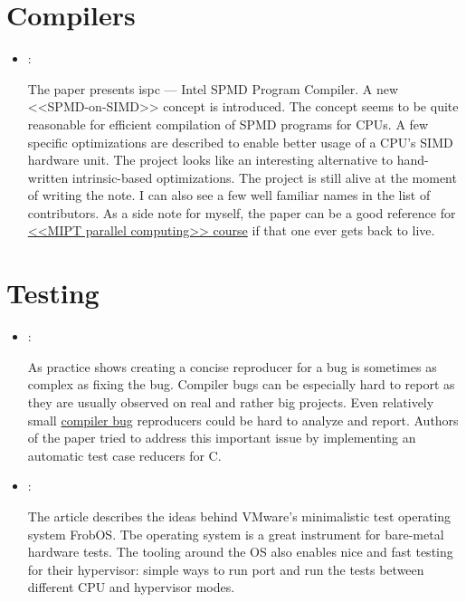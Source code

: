 \section*{Compilers}
\begin{itemize}
    \item \cite{Pharr:ispc:2012}:

    The paper presents ispc --- Intel SPMD Program Compiler. A new <<SPMD-on-SIMD>> concept is introduced. The concept seems to be quite reasonable for efficient compilation of SPMD programs for CPUs. A few specific optimizations are described to enable better usage of a CPU's SIMD hardware unit. The project looks like an interesting alternative to hand-written intrinsic-based optimizations. The project is still alive at the moment of writing the note. I can also see a few well familiar names in the list of contributors. As a side note for myself, the paper can be a good reference for \href{https://github.com/yulyugin/mipt-parallel-computing}{<<MIPT parallel computing>> course} if that one ever gets back to live.
\end{itemize}

\section*{Testing}
\begin{itemize}
    \item \cite{Regehr:C-Reduce:2012}:

    As practice shows creating a concise reproducer for a bug is sometimes as complex as fixing the bug. Compiler bugs can be especially hard to report as they are usually observed on real and rather big projects. Even relatively small \href{https://yulyugin.github.io/blog/2022/icc-bug}{compiler bug} reproducers could be hard to analyze and report. Authors of the paper tried to address this important issue by implementing an automatic test case reducers for C.

    \item \cite{Easson:FrobOS:2012}:

    The article describes the ideas behind VMware's minimalistic test operating system FrobOS. Tbe operating system is a great instrument for bare-metal hardware tests. The tooling around the OS also enables nice and fast testing for their hypervisor: simple ways to run port and run the tests between different CPU and hypervisor modes.
\end{itemize}

